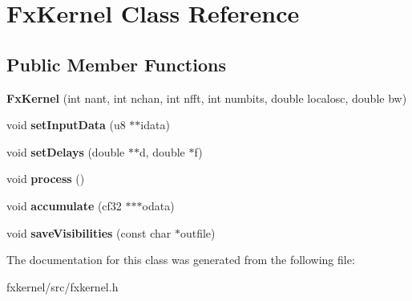 \hypertarget{classFxKernel}{}\section{Fx\+Kernel Class Reference}
\label{classFxKernel}
\subsection*{Public Member Functions}
\begin{DoxyCompactItemize}
\item 
{\bfseries Fx\+Kernel} (int nant, int nchan, int nfft, int numbits, double localosc, double bw)\hypertarget{classFxKernel_a86d4996573ac8c6244323b7fa299c315}{}\label{classFxKernel_a86d4996573ac8c6244323b7fa299c315}

\item 
void {\bfseries set\+Input\+Data} (u8 $\ast$$\ast$idata)\hypertarget{classFxKernel_a82ed167e38578d48e3d956992aa2d0b0}{}\label{classFxKernel_a82ed167e38578d48e3d956992aa2d0b0}

\item 
void {\bfseries set\+Delays} (double $\ast$$\ast$d, double $\ast$f)\hypertarget{classFxKernel_a22ca9951ed0f452c832b1d10e29d54f6}{}\label{classFxKernel_a22ca9951ed0f452c832b1d10e29d54f6}

\item 
void {\bfseries process} ()\hypertarget{classFxKernel_a7086f405fc5c807857289ab5def9f56e}{}\label{classFxKernel_a7086f405fc5c807857289ab5def9f56e}

\item 
void {\bfseries accumulate} (cf32 $\ast$$\ast$$\ast$odata)\hypertarget{classFxKernel_af1690f309b16bba6d9d73c109d2db9ba}{}\label{classFxKernel_af1690f309b16bba6d9d73c109d2db9ba}

\item 
void {\bfseries save\+Visibilities} (const char $\ast$outfile)\hypertarget{classFxKernel_a6235ee9444c2c8b9d17db9591445f990}{}\label{classFxKernel_a6235ee9444c2c8b9d17db9591445f990}

\end{DoxyCompactItemize}


The documentation for this class was generated from the following file\+:\begin{DoxyCompactItemize}
\item 
fxkernel/src/fxkernel.\+h\end{DoxyCompactItemize}
